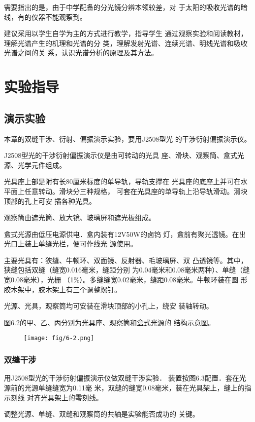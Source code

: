 需要指出的是，由于中学配备的分光镜分辨本领较差，对
于太阳的吸收光谱的暗线，有的仪器不能观察到。

建议采用以学生自学为主的方式进行教学，指导学生
通过观察实验和阅读教材，理解光谱产生的机理和光谱的分
类，理解发射光谱、连续光谱、明线光谱和吸收光谱之间的关
系，认识光谱分析的原理及其方法。

\section{实验指导}
\subsection{演示实验}
本章的双缝干涉、衍射、偏振演示实验，要用J2508型光
的干涉衍射偏振演示仪。

J2508型光的干涉衍射偏振演示仪是由可转动的光具
座、滑块、观察筒、盒式光源、光学元件组成。

光具座上部是附有长80厘米标度的单导轨，导轨支撑在
光具座的底座上并可在水平面上任意转动。滑块分三种规格，
可套在光具座的单导轨上沿导轨滑动。滑块顶部的孔上可安
插各种光具。

观察筒由遮光筒、放大镜、玻璃屏和遮光板组成。

盒式光源由低压电源供电．盒内装有12V50W的卤钨
灯，盒前有聚光透镜。在出光口上装上单缝光栏，便可作线光
源使用。

主要光具有：狭缝、牛顿环、双面镜、反射器、毛玻璃屏、双
凸透镜等。其中，狭缝包括双缝（缝宽0.016毫米，缝距分别
为0.04毫米和0.08毫米两种）、单缝（缝宽0.08毫米），光栅
（1\%）。多缝缝宽0.02毫米，缝距0.08毫米。牛顿环装在圆
形胶木架中，胶木架上有三个调整螺钉。

光源、光具，观察筒均可安装在滑块顶部的小孔上，绕安
装轴转动。

图6.2的甲、乙、丙分别为光具座、观察筒和盒式光源的
结构示意图。

\begin{figure}[htp]
    \centering
    \texttt{[image: fig/6-2.png]}
    \caption{}
\end{figure}

\subsubsection{双缝干涉}
用J2508型光的干涉衍射偏振演示仪做双缝干涉实验．
装置按图6.3配置．套在光源前的光源单缝缝宽为0.11毫
米，双缝的缝宽0.08毫米，装在光具架上，缝上的指示刻线
对齐光具架上的零刻线。

调整光源、单缝、双缝和观察筒的共轴是实验能否成功的
关键。

